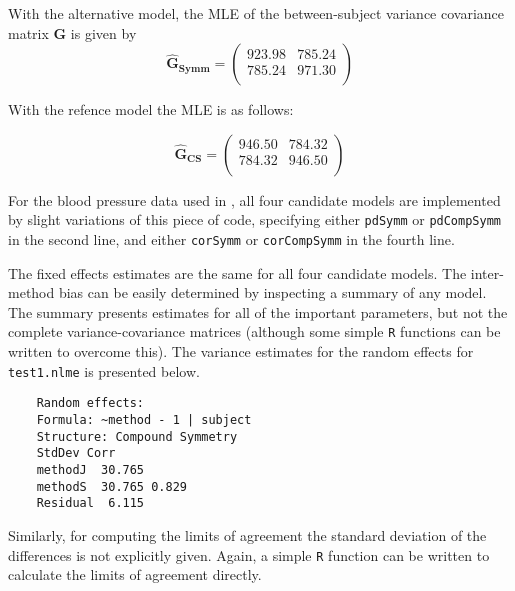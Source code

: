 \documentclass[12pt, a4paper]{report}
\theoremstyle{plain}
\theoremstyle{definition}
\theoremstyle{remark}
\begin{document}
With the alternative model, the MLE of the between-subject variance covariance matrix $\boldsymbol{G}$ is given by
\begin{equation}
\boldsymbol{\hat{G}_{Symm}} = \left( \begin{array}{cc}
923.98 & 785.24  \\
785.24 & 971.30  \\
\end{array}\right)
\end{equation}

With the refence model the MLE is as follows:

\begin{equation}
\boldsymbol{\hat{G}_{CS}} = \left( \begin{array}{cc}
946.50 & 784.32  \\
784.32 & 946.50  \\
\end{array}\right)
\end{equation}


For the blood pressure data used in \citet{ARoy2009}, all four candidate models are implemented by slight variations of this piece of code, specifying either \texttt{pdSymm} or \texttt{pdCompSymm} in the second line, and either \texttt{corSymm} or \texttt{corCompSymm} in the fourth line.


The fixed effects estimates are the same for all four candidate models. The inter-method bias can be easily determined by inspecting a summary of any model. The summary presents estimates for all of the important parameters, but not the complete variance-covariance matrices (although some simple \texttt{R} functions can be written to overcome this). The variance estimates for the random effects for \texttt{test1.nlme} is presented below.

\begin{framed}
	\begin{verbatim}
	Random effects:
	Formula: ~method - 1 | subject
	Structure: Compound Symmetry
	StdDev Corr
	methodJ  30.765
	methodS  30.765 0.829
	Residual  6.115
	\end{verbatim}
\end{framed}

Similarly, for computing the limits of agreement the standard deviation of the differences is not explicitly given. Again, a simple \texttt{R} function can be written to calculate the limits of agreement directly.

\newpage
\end{document}
